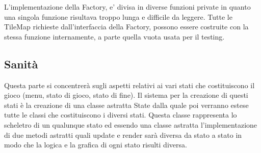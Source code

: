 \documentclass[a4paper,12pt]{report}
\begin{document}
    \par L'implementazione della Factory, e' divisa in diverse funzioni private
    in quanto una singola funzione risultava troppo lunga e difficile da leggere.
    Tutte le TileMap richieste dall'interfaccia della Factory, possono essere costruite con la stessa funzione internamente,
    a parte quella vuota usata per il testing.

    \subsection{Sanità}
    \par Questa parte si concentrerà sugli aspetti relativi ai vari stati che costituiscono il gioco (menu, stato di gioco, stato di fine).
     Il sistema per la creazione di questi stati è la creazione di una classe astratta State dalla quale poi verranno
     estese tutte le classi che costituiscono i diversi stati. Questa classe rappresenta lo scheletro di un qualunque
     stato ed essendo una classe astratta l’implementazione di due metodi astratti quali update e render sarà diversa da
     stato a stato in modo che la logica e la grafica di ogni stato risulti diversa.
    \\
    \\
    \par
\end{document}
